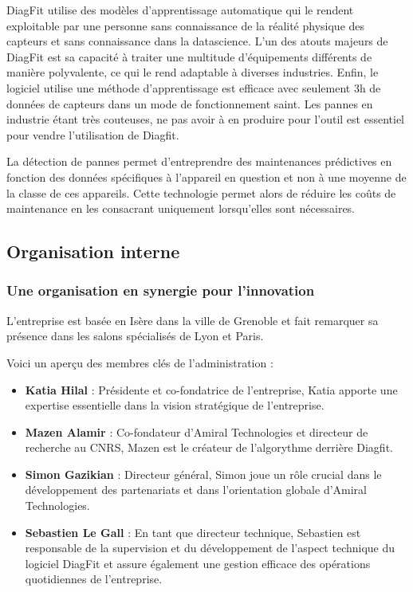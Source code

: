 DiagFit utilise des modèles d'apprentissage automatique qui le rendent exploitable par une personne sans connaissance de la réalité physique des capteurs et sans connaissance dans la datascience.
L'un des atouts majeurs de DiagFit est sa capacité à traiter une multitude d'équipements différents de manière polyvalente, ce qui le rend adaptable à diverses industries.
Enfin, le logiciel utilise une méthode d'apprentissage est efficace avec seulement 3h de données de capteurs dans un mode de fonctionnement saint.
Les pannes en industrie étant très couteuses, ne pas avoir à en produire pour l'outil est essentiel pour vendre l'utilisation de Diagfit.

La détection de pannes permet d'entreprendre des maintenances prédictives en fonction des données spécifiques à l'appareil en question et non à une moyenne de la classe de ces appareils.
Cette technologie permet alors de réduire les coûts de maintenance en les consacrant uniquement lorsqu'elles sont nécessaires.

\subsection{Organisation interne}
\subsubsection{Une organisation en synergie pour l'innovation}
L'entreprise est basée en Isère dans la ville de Grenoble et fait remarquer sa présence dans les salons spécialisés de Lyon et Paris.

Voici un aperçu des membres clés de l'administration :
\begin{itemize}
    \item \textbf{Katia Hilal} : Présidente et co-fondatrice de l'entreprise, Katia apporte une expertise essentielle dans la vision stratégique de l'entreprise.
    \item \textbf{Mazen Alamir} : Co-fondateur d'Amiral Technologies et directeur de recherche au CNRS, Mazen est le créateur de l'algorythme derrière Diagfit.
    \item \textbf{Simon Gazikian} : Directeur général, Simon joue un rôle crucial dans le développement des partenariats et dans l'orientation globale d'Amiral Technologies.
    \item \textbf{Sebastien Le Gall} : En tant que directeur technique, Sebastien est responsable de la supervision et du développement de l'aspect technique du logiciel DiagFit et assure également une gestion efficace des opérations quotidiennes de l'entreprise.
\end{itemize}\phantom{vide pour separer}\\

